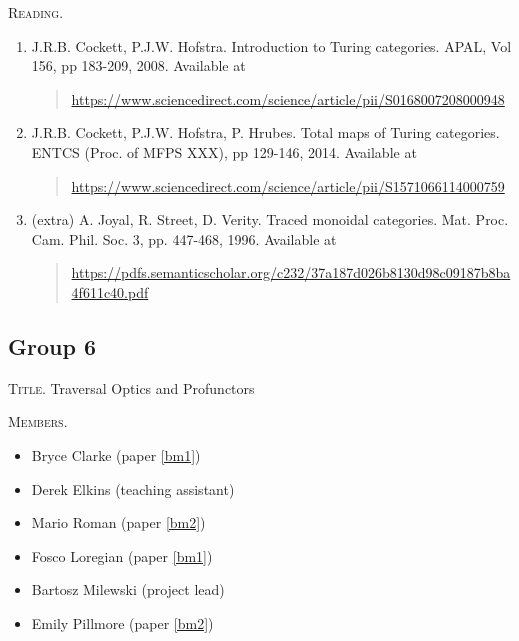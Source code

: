 \documentclass[11pt, oneside]{article}
\begin{document}
\textsc{Reading.}
\begin{enumerate}
\item \label{ph1}
  J.R.B. Cockett, P.J.W. Hofstra. Introduction to Turing
  categories. APAL, Vol 156, pp 183-209, 2008. Available at
  \begin{quote} \href{https://www.sciencedirect.com/science/article/pii/S0168007208000948}{https://www.sciencedirect.com/science/article/pii/S0168007208000948}
  \end{quote}
\item \label{ph2}
  J.R.B. Cockett, P.J.W. Hofstra, P. Hrubes. Total maps of
  Turing categories. ENTCS (Proc. of MFPS XXX), pp 129-146,
  2014. Available at
  \begin{quote} \href{https://www.sciencedirect.com/science/article/pii/S1571066114000759}{https://www.sciencedirect.com/science/article/pii/S1571066114000759}
  \end{quote}
\item (extra)
  A. Joyal, R. Street, D. Verity. Traced monoidal
  categories. Mat. Proc. Cam. Phil. Soc. 3, pp. 447-468,
  1996. Available at
  \begin{quote} \href{https://pdfs.semanticscholar.org/c232/37a187d026b8130d98c09187b8ba4f611c40.pdf}{https://pdfs.semanticscholar.org/c232/37a187d026b8130d98c09187b8ba4f611c40.pdf}
  \end{quote}
\end{enumerate}

\pagebreak

%
%

\subsection*{Group 6}

\textsc{Title.}
Traversal Optics and Profunctors

\textsc{Members.}
\begin{multicols}{2}
  \begin{itemize}
  \item Bryce Clarke (paper \ref{bm1})
  \item Derek Elkins (teaching assistant)
  \item Mario Roman (paper \ref{bm2})
  \item Fosco Loregian (paper \ref{bm1})
  \item Bartosz Milewski (project lead)
  \item Emily Pillmore (paper \ref{bm2})
  \end{itemize}
\end{multicols}
\end{document}

